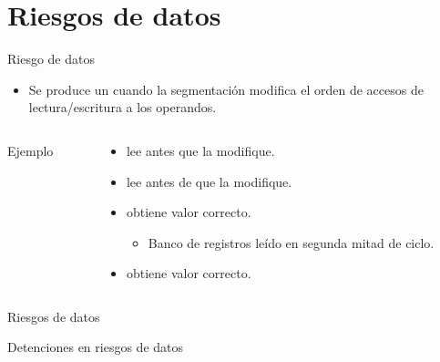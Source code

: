 \section{Riesgos de datos}

\begin{frame}[t,fragile]{Riesgo de datos}
\begin{itemize}
  \item Se produce un  cuando la segmentación 
        modifica el orden de accesos de lectura/escritura a los operandos.
\end{itemize}
\begin{columns}
\begin{column}{.45\textwidth}
\begin{block}{Ejemplo}

\end{block}
\end{column}
\begin{column}{.55\textwidth}
\begin{itemize}
  \item {} lee  antes que  la modifique.
  \item {} lee  antes de que  la modifique.
  \item {} obtiene valor correcto.
    \begin{itemize}
      \item Banco de registros leído en segunda mitad de ciclo.
    \end{itemize}
  \item {} obtiene valor correcto.
\end{itemize}
\end{column}
\end{columns}
\end{frame}
      
\begin{frame}[t]{Riesgos de datos}
\makebox[\textwidth][c]{

}
\end{frame}

\begin{frame}[t]{Detenciones en riesgos de datos}
\makebox[\textwidth][c]{

}
\end{frame}

